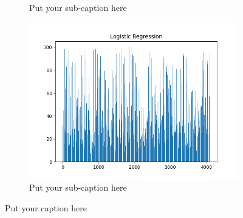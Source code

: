 \documentclass{article}
\begin{document}
\begin{figure}[ht]
\begin{subfigure}{.33\textwidth}
  \caption{Put your sub-caption here}
  \label{fig:sub-second}
\end{subfigure}
\begin{subfigure}{.33\textwidth}
  \centering
  \includegraphics[width=1\linewidth]{1b/Figure_1_bra.png}  
  \caption{Put your sub-caption here}
  \label{fig:sub-second}
\end{subfigure}
\caption{Put your caption here}
\label{imp feat}
\end{figure}
\end{document}
